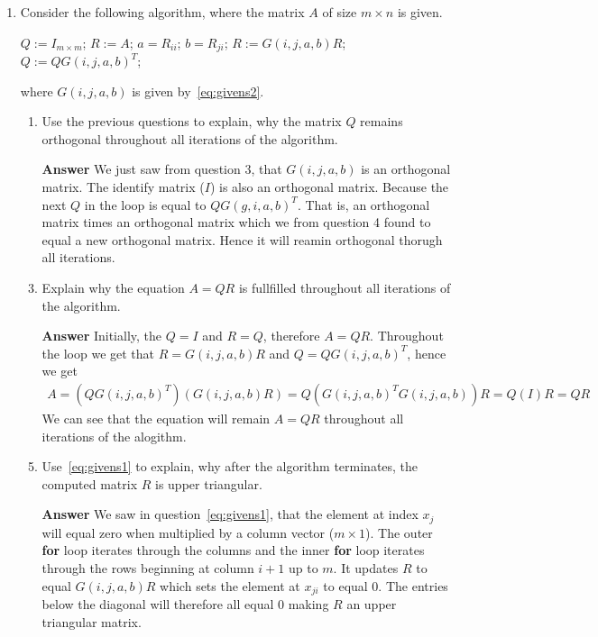 \documentclass[10pt,a4paper]{article}
\theoremstyle{plain}
\theoremstyle{definition}
\begin{document}
\begin{enumerate}
  \item Consider the following algorithm, where the matrix \(A\) of size \(m\times n\) is given.
  \begin{algorithmic}
    \STATE \(Q:= I_{m\times m}\); \(R:= A\);
    \STATE \(a = R_{ii}\); \(b = R_{ji}\);
    \STATE \(R := G(i,j,a,b)R\); \(Q := Q G(i,j,a,b)^T\);
    \ENDIF
    \ENDFOR
    \ENDFOR
  \end{algorithmic}
  where \(G(i,j,a,b)\) is given by~\eqref{eq:givens2}.
  \begin{enumerate}
    \item Use the previous questions to explain, why the matrix \(Q\) remains orthogonal throughout all iterations of the algorithm.
    \item[\textbf{Answer}] We just saw from question 3, that $G(i,j,a,b)$ is an orthogonal matrix. The identify matrix ($I$) is also an orthogonal matrix. Because the next $Q$ in the loop is equal to $QG(g,i,a,b)^T$. That is, an orthogonal matrix times an orthogonal matrix which we from question 4 found to equal a new orthogonal matrix. Hence it will reamin orthogonal thorugh all iterations.
    \item Explain why the equation \(A=QR\) is fullfilled throughout all iterations of the algorithm.
    \item[\textbf{Answer}] Initially, the $Q=I$ and $R=Q$, therefore $A=QR$. Throughout the loop we get that $R=G(i,j,a,b)R$ and $Q=QG(i,j,a,b)^T$, hence we get
    \begin{align*}
      A=(QG(i,j,a,b)^T)(G(i,j,a,b)R)=Q(G(i,j,a,b)^TG(i,j,a,b))R=Q(I)R=QR
    \end{align*}
    We can see that the equation will remain $A=QR$ throughout all iterations of the alogithm.
    \item Use~\eqref{eq:givens1} to explain, why after the algorithm terminates, the computed matrix \(R\) is upper triangular.
    \item[\textbf{Answer}] We saw in question~\eqref{eq:givens1}, that the element at index $x_j$ will equal zero when multiplied by a column vector ($m \times 1$). The outer \textbf{for} loop iterates through the columns and the inner \textbf{for} loop iterates through the rows beginning at column $i+1$ up to $m$. It updates $R$ to equal $G(i,j,a,b)R$ which sets the element at $x_{ji}$ to equal 0. The entries below the diagonal will therefore all equal 0 making $R$ an upper triangular matrix.
  \end{enumerate}
\end{enumerate}
\end{document}
